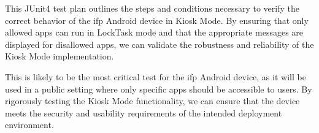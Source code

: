   This JUnit4 test plan outlines the steps and conditions necessary to verify the correct behavior of the \gls{ifp} Android device in Kiosk Mode. By ensuring that only allowed apps can run in LockTask mode and that the appropriate messages are displayed for disallowed apps, we can validate the robustness and reliability of the Kiosk Mode implementation.
  \wrapfill


  This is likely to be the most critical test for the \gls{ifp} Android device, as it will be used in a public setting where only specific apps should be accessible to users. By rigorously testing the Kiosk Mode functionality, we can ensure that the device meets the security and usability requirements of the intended deployment environment.
